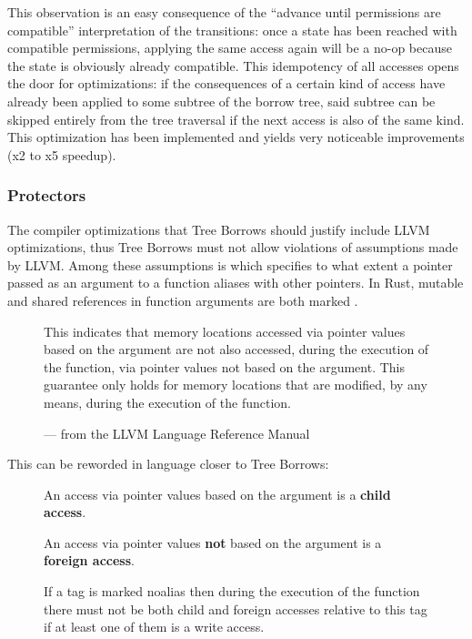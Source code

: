 \documentclass[a4paper,11pt]{article}
\theoremstyle{plain}
\theoremstyle{definition}
\theoremstyle{remark}
\newcommand{\tcode}[1]{\rstinline{#1}}
\begin{document}
This observation is an easy consequence of the ``advance until permissions are compatible''
interpretation of the transitions: once a state has been reached with compatible
permissions, applying the same access again will be a no-op because the state
is obviously already compatible. This idempotency of all accesses opens the door
for optimizations: if the consequences of a certain kind of access have already
been applied to some subtree of the borrow tree, said subtree can be skipped entirely
from the tree traversal if the next access is also of the same kind. This optimization
has been implemented and yields very noticeable improvements (x2 to x5 speedup).


\subsubsection{Protectors}
\label{sec:need-protect}

The compiler optimizations that Tree Borrows should justify include LLVM optimizations,
thus Tree Borrows must not allow violations of assumptions made by LLVM. Among these
assumptions is \tcode{noalias} which specifies to what extent a pointer passed as an
argument to a function aliases with other pointers. In Rust, mutable and shared
references in function arguments are both marked \tcode{noalias}.

\begin{figure}[h]
    \centering
    \begin{minipage}{0.8\textwidth}
        \tcode{noalias}

        This indicates that memory locations accessed via pointer values based on the argument
        are not also accessed, during the execution of the function, via pointer values not based on
        the argument. This guarantee only holds for memory locations that are modified,
        by any means, during the execution of the function.

        --- from the LLVM Language Reference Manual \cite{llvm_langref}
    \end{minipage}
\end{figure}

This can be reworded in language closer to Tree Borrows:

\begin{figure}[h]
    \centering
    \begin{minipage}{0.8\textwidth}
        An access via pointer values based on the argument is a \textbf{child access}.

        An access via pointer values \textbf{not} based on the argument is a \textbf{foreign access}.

        If a tag is marked noalias then during the execution of the function there must
        not be both child and foreign accesses relative to this tag if at least one of them is a write access.
    \end{minipage}
\end{figure}
\end{document}
